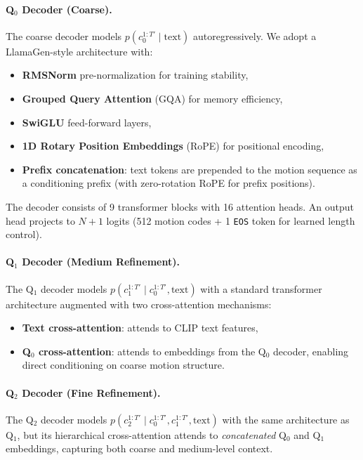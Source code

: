 \documentclass[10pt,twocolumn]{article}
\begin{document}
\paragraph{Q$_0$ Decoder (Coarse).}
The coarse decoder models $p(c_0^{1:T'} \mid \text{text})$ autoregressively. We adopt a LlamaGen-style architecture with:
\begin{itemize}[nosep,leftmargin=*]
    \item \textbf{RMSNorm} pre-normalization for training stability,
    \item \textbf{Grouped Query Attention} (GQA) for memory efficiency,
    \item \textbf{SwiGLU} feed-forward layers,
    \item \textbf{1D Rotary Position Embeddings} (RoPE) for positional encoding,
    \item \textbf{Prefix concatenation}: text tokens are prepended to the motion sequence as a conditioning prefix (with zero-rotation RoPE for prefix positions).
\end{itemize}
The decoder consists of 9 transformer blocks with 16 attention heads. An output head projects to $N{+}1$ logits (512 motion codes + 1 \texttt{EOS} token for learned length control).

\paragraph{Q$_1$ Decoder (Medium Refinement).}
The Q$_1$ decoder models $p(c_1^{1:T'} \mid c_0^{1:T'}, \text{text})$ with a standard transformer architecture augmented with two cross-attention mechanisms:
\begin{itemize}[nosep,leftmargin=*]
    \item \textbf{Text cross-attention}: attends to CLIP text features,
    \item \textbf{Q$_0$ cross-attention}: attends to embeddings from the Q$_0$ decoder, enabling direct conditioning on coarse motion structure.
\end{itemize}

\paragraph{Q$_2$ Decoder (Fine Refinement).}
The Q$_2$ decoder models $p(c_2^{1:T'} \mid c_0^{1:T'}, c_1^{1:T'}, \text{text})$ with the same architecture as Q$_1$, but its hierarchical cross-attention attends to \emph{concatenated} Q$_0$ and Q$_1$ embeddings, capturing both coarse and medium-level context.
\end{document}
